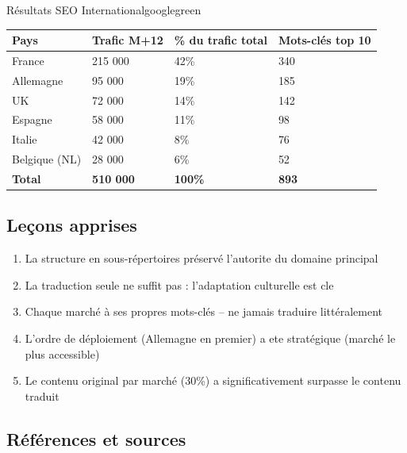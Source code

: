 \documentclass[12pt,a4paper,twoside]{report}
\begin{document}
\begin{mybox}{Résultats SEO International}{googlegreen}
\begin{tabular}{llll}
    \toprule
    \textbf{Pays} & \textbf{Trafic M+12} & \% du trafic total & \textbf{Mots-clés top 10} \\
    \midrule
    France        & 215 000              & 42\%               & 340 \\
    Allemagne     & 95 000               & 19\%               & 185 \\
    UK            & 72 000               & 14\%               & 142 \\
    Espagne       & 58 000               & 11\%               & 98 \\
    Italie        & 42 000               & 8\%                & 76 \\
    Belgique (NL) & 28 000               & 6\%                & 52 \\
    \midrule
    \textbf{Total} & \textbf{510 000}    & \textbf{100\%}     & \textbf{893} \\
    \bottomrule
\end{tabular}
\end{mybox}

\subsection{Leçons apprises}
\begin{enumerate}
    \item La structure en sous-répertoires préservé l'autorite du domaine principal
    \item La traduction seule ne suffit pas : l'adaptation culturelle est cle
    \item Chaque marché à ses propres mots-clés -- ne jamais traduire littéralement
    \item L'ordre de déploiement (Allemagne en premier) a ete stratégique (marché le plus accessible)
    \item Le contenu original par marché (30\%) a significativement surpasse le contenu traduit
\end{enumerate}

\subsection{Références et sources}
\end{document}

